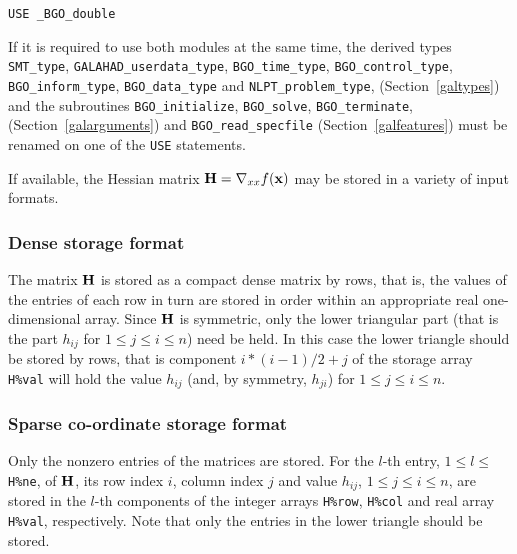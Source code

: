 \documentclass{galahad}
\newcommand{\packagename}{BGO}
\newcommand{\fullpackagename}{\libraryname\_\packagename}
\begin{document}
\hspace{8mm} {\tt USE  \fullpackagename\_double}

\medskip

\noindent
If it is required to use both modules at the same time, the derived types
{\tt SMT\_type},
{\tt GALAHAD\_userdata\_type},
{\tt \packagename\_time\_\-type},
{\tt \packagename\_control\_type},
{\tt \packagename\_inform\_type},
{\tt \packagename\_data\_type}
and
{\tt NLPT\_problem\_type},
(Section~\ref{galtypes})
and the subroutines
{\tt \packagename\_initialize},
{\tt \packagename\_\-solve},
{\tt \packagename\_terminate},
(Section~\ref{galarguments})
and
{\tt \packagename\_read\_specfile}
(Section~\ref{galfeatures})
must be renamed on one of the {\tt USE} statements.


\galmatrix
If available, the Hessian matrix ${\mathbf{H}} = \nabla_{xx} f({\mathbf{x}})$
may be stored in a variety of input formats.

\subsubsection{Dense storage format}\label{dense}
The matrix ${\mathbf{H}}$ is stored as a compact
dense matrix by rows, that is, the values of the entries of each row in turn are
stored in order within an appropriate real one-dimensional array.
Since ${\mathbf{H}}$ is symmetric, only the lower triangular part (that is the part
$h_{ij}$ for $1 \leq j \leq i \leq n$) need be held. In this case
the lower triangle should be stored by rows, that is
component $i \ast (i-1)/2 + j$ of the storage array {\tt H\%val}
will hold the value $h_{ij}$ (and, by symmetry, $h_{ji}$)
for $1 \leq j \leq i \leq n$.

\subsubsection{Sparse co-ordinate storage format}\label{coordinate}
Only the nonzero entries of the matrices are stored.
For the $l$-th entry, $1 \leq l \leq$ {\tt H\%ne}, of ${\mathbf{H}}$,
its row index $i$, column index $j$ and value $h_{ij}$,
$1 \leq j \leq i \leq n$,
are stored in the $l$-th components of the integer arrays {\tt H\%row},
{\tt H\%col} and real array {\tt H\%val}, respectively.
Note that only the entries in the lower triangle should be stored.
\end{document}
